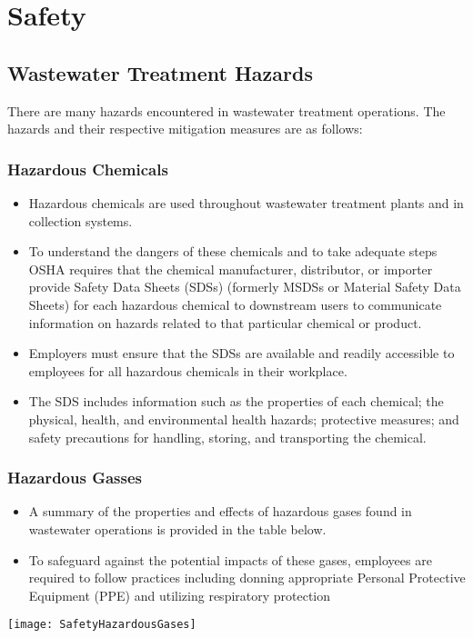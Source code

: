 
\chapter{Safety}
\section{Wastewater Treatment Hazards}
There are many hazards encountered in wastewater treatment operations.  The hazards and their respective mitigation measures are as follows:\\
\subsection{Hazardous Chemicals}
\begin{itemize}
\item Hazardous chemicals are used throughout wastewater treatment plants and in collection systems. 
\item To understand the dangers of these chemicals and to take adequate steps OSHA requires that the chemical manufacturer, distributor, or importer provide Safety Data Sheets (SDSs) (formerly MSDSs or Material Safety Data Sheets) for each hazardous chemical to downstream users to communicate information on hazards related to that particular chemical or product.
\item Employers must ensure that the SDSs are available and readily accessible to employees for all hazardous chemicals in their workplace.
\item The SDS includes information such as the properties of each chemical; the physical, health, and environmental health hazards; protective measures; and safety precautions for handling, storing, and transporting the chemical.\\
\end{itemize}
\subsection{Hazardous Gasses}
\begin{itemize}
\item A summary of the properties and effects of hazardous gases found in wastewater operations is provided in the table below.
\item To safeguard against the potential impacts of these gases, employees are required to follow practices including donning appropriate Personal Protective Equipment (PPE) and utilizing respiratory protection\\
\end{itemize}
\begin{center}
\texttt{[image: SafetyHazardousGases]}\\ 
\end{center}

